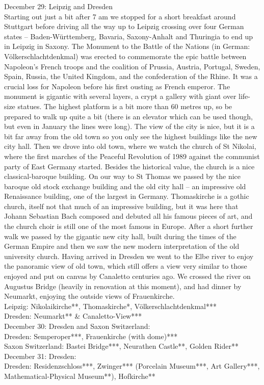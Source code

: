 December 29: Leipzig and Dresden\\
Starting out just a bit after 7 am we stopped for a short breakfast around Stuttgart before driving all the way up to Leipzig crossing over four German states -- Baden-W\"urttemberg, Bavaria, Saxony-Anhalt and Thuringia to end up in Leipzig in Saxony. The Monument to the Battle of the Nations (in German: V\"olkerschlachtdenkmal) was erected to commemorate the epic battle between Napoleon's French troops and the coalition of Prussia, Austria, Portugal, Sweden, Spain, Russia, the United Kingdom, and the confederation of the Rhine. It was a crucial loss for Napoleon before his first ousting as French emperor. The monument is gigantic with several layers, a crypt a gallery with giant over life-size statues. The highest platform is a bit more than 60 metres up, so be prepared to walk up quite a bit (there is an elevator which can be used though, but even in January the lines were long). The view of the city is nice, but it is a bit far away from the old town so you only see the highest buildings like the new city hall. Then we drove into old town, where we watch the church of St Nikolai, where the first marches of the Peaceful Revolution of 1989 against the communist party of East Germany started. Besides the historical value, the church is a nice classical-baroque building. On our way to St Thomas we passed by the nice baroque old stock exchange building and the old city hall -- an impressive old Renaissance building, one of the largest in Germany. Thomaskirche is a gothic church, itself not that much of an impressive building, but it was here that Johann Sebastian Bach composed and debuted all his famous pieces of art, and the church choir is still one of the most famous in Europe. After a short further walk we passed by the gigantic new city hall, built during the times of the German Empire and then we saw the new modern interpretation of the old university church. Having arrived in Dresden we went to the Elbe river to enjoy the panoramic view of old town, which still offers a view very similar to those enjoyed and put on canvas by Canaletto centuries ago. We crossed the river on Augustus Bridge (heavily in renovation at this moment), and had dinner by Neumarkt, enjoying the outside views of Frauenkirche.\\

Leipzig: Nikolaikirche**, Thomaskirche*, V\"olkerschlachtdenkmal***\\
Dresden: Neumarkt** \& Canaletto-View***\\

December 30: Dresden and Saxon Switzerland:\\

Dresden: Semperoper***, Frauenkirche (with dome)***\\
Saxon Switzerland: Bastei Bridge***, Neurathen Castle**, Golden Rider**\\

December 31: Dresden:\\

Dresden: Residenzschloss***, Zwinger*** (Porcelain Museum***, Art Gallery***, Mathematical-Physical Museum**), Hofkirche**\\



